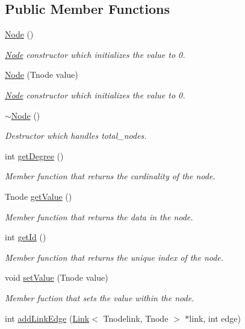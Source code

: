 \subsection*{Public Member Functions}
\begin{DoxyCompactItemize}
\item 
\hyperlink{classNode_a93fa08e2d8c63f93e3cc9ab8202e3334}{Node} ()
\begin{DoxyCompactList}\small\item\em \hyperlink{classNode}{Node} constructor which initializes the value to 0. \end{DoxyCompactList}\item 
\hyperlink{classNode_a5e6d51ef5b0456c3fd48b8196baebea5}{Node} (Tnode value)
\begin{DoxyCompactList}\small\item\em \hyperlink{classNode}{Node} constructor which initializes the value to 0. \end{DoxyCompactList}\item 
\hyperlink{classNode_a3bc7885a7623bde95ddd068d13c91af3}{$\sim$\+Node} ()
\begin{DoxyCompactList}\small\item\em Destructor which handles total\+\_\+nodes. \end{DoxyCompactList}\item 
int \hyperlink{classNode_a58fa0d9e8d2099bb0afd533d8ae55d12}{get\+Degree} ()
\begin{DoxyCompactList}\small\item\em Member function that returns the cardinality of the node. \end{DoxyCompactList}\item 
Tnode \hyperlink{classNode_aa9067e2137ecc75ddd802d5a574612f1}{get\+Value} ()
\begin{DoxyCompactList}\small\item\em Member function that returns the data in the node. \end{DoxyCompactList}\item 
int \hyperlink{classNode_a91639d810acda39b666715b07b5c2100}{get\+Id} ()
\begin{DoxyCompactList}\small\item\em Member function that returns the unique index of the node. \end{DoxyCompactList}\item 
void \hyperlink{classNode_a39ea9f0c2d3af467734b5c78a001bbcb}{set\+Value} (Tnode value)
\begin{DoxyCompactList}\small\item\em Member fuction that sets the value within the node. \end{DoxyCompactList}\item 
int \hyperlink{classNode_a669f230accdef7328ef0c217c63b0dd4}{add\+Link\+Edge} (\hyperlink{classLink}{Link}$<$ Tnodelink, Tnode $>$ $\ast$link, int edge)\hypertarget{classNode_a669f230accdef7328ef0c217c63b0dd4}{}\label{classNode_a669f230accdef7328ef0c217c63b0dd4}


\end{DoxyCompactItemize}
